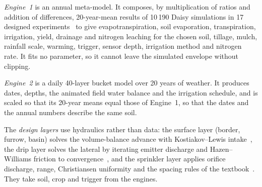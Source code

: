 \documentclass[preprint,12pt]{elsarticle}
\begin{document}
\emph{Engine~1} is an annual meta-model. It composes, by multiplication of ratios and addition of differences, 20-year-mean results of 10\,190 Daisy simulations in 17 designed experiments~\cite{HaliluData} to give evapotranspiration, soil evaporation, transpiration, irrigation, yield, drainage and nitrogen leaching for the chosen soil, tillage, mulch, rainfall scale, warming, trigger, sensor depth, irrigation method and nitrogen rate. It fits no parameter, so it cannot leave the simulated envelope without clipping.

\emph{Engine~2} is a daily 40-layer bucket model over 20 years of weather. It produces dates, depths, the animated field water balance and the irrigation schedule, and is scaled so that its 20-year means equal those of Engine~1, so that the dates and the annual numbers describe the same soil.

The \emph{design layers} use hydraulics rather than data: the surface layer (border, furrow, basin) solves the volume-balance advance with Kostiakov--Lewis intake~\cite{Walker1987,Walker1989}, the drip layer solves the lateral by iterating emitter discharge and Hazen--Williams friction to convergence~\cite{KellerKarmeli1974,Keller1990}, and the sprinkler layer applies orifice discharge, range, Christiansen uniformity and the spacing rules of the textbook~\cite{Keller1990,Christiansen1942,Playan2005}. They take soil, crop and trigger from the engines.

\end{document}
